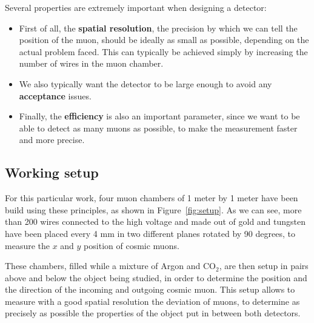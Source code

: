 \documentclass[a4paper, 11pt, twoside, openright]{report}
\begin{document}
Several properties are extremely important when designing a detector:
\begin{itemize}
\item First of all, the \textbf{spatial resolution}, the precision by which we can tell the position of the muon, should be ideally as small as possible, depending on the actual problem faced. This can typically be achieved simply by increasing the number of wires in the muon chamber.
\item We also typically want the detector to be large enough to avoid any \textbf{acceptance} issues.
\item Finally, the \textbf{efficiency} is also an important parameter, since we want to be able to detect as many muons as possible, to make the measurement faster and more precise.
\end{itemize}

\subsection{Working setup} \label{sec:ourSetup}

For this particular work, four muon chambers of 1 meter by 1 meter have been build using these principles, as shown in Figure~\ref{fig:setup}. As we can see, more than 200 wires connected to the high voltage and made out of gold and tungsten have been placed every 4 mm in two different planes rotated by 90 degrees, to measure the $x$ and $y$ position of cosmic muons. 

These chambers, filled while a mixture of Argon and CO$_2$, are then setup in pairs above and below the object being studied, in order to determine the position and the direction of the incoming and outgoing cosmic muon. This setup allows to measure with a good spatial resolution the deviation of muons, to determine as precisely as possible the properties of the object put in between both detectors.
\end{document}
